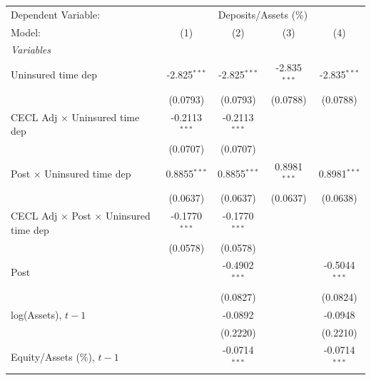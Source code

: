 
\begingroup
\centering
\begin{tabular}{lcccc}
   \tabularnewline \midrule \midrule
   Dependent Variable: & \multicolumn{4}{c}{Deposits/Assets (\%)}\\
   Model:                                                & (1)             & (2)             & (3)             & (4)\\  
   \midrule
   \emph{Variables}\\
   Uninsured time dep                                    & -2.825$^{***}$  & -2.825$^{***}$  & -2.835$^{***}$  & -2.835$^{***}$\\   
                                                         & (0.0793)        & (0.0793)        & (0.0788)        & (0.0788)\\   
   CECL Adj $\times$ Uninsured time dep                  & -0.2113$^{***}$ & -0.2113$^{***}$ &                 &   \\   
                                                         & (0.0707)        & (0.0707)        &                 &   \\   
   Post $\times$ Uninsured time dep                      & 0.8855$^{***}$  & 0.8855$^{***}$  & 0.8981$^{***}$  & 0.8981$^{***}$\\   
                                                         & (0.0637)        & (0.0637)        & (0.0637)        & (0.0638)\\   
   CECL Adj $\times$ Post $\times$ Uninsured time dep    & -0.1770$^{***}$ & -0.1770$^{***}$ &                 &   \\   
                                                         & (0.0578)        & (0.0578)        &                 &   \\   
   Post                                                  &                 & -0.4902$^{***}$ &                 & -0.5044$^{***}$\\   
                                                         &                 & (0.0827)        &                 & (0.0824)\\   
   log(Assets), $t{-}1$                                  &                 & -0.0892         &                 & -0.0948\\   
                                                         &                 & (0.2220)        &                 & (0.2210)\\   
   Equity/Assets (\%), $t{-}1$                           &                 & -0.0714$^{***}$ &                 & -0.0714$^{***}$\\   

\end{tabular}
